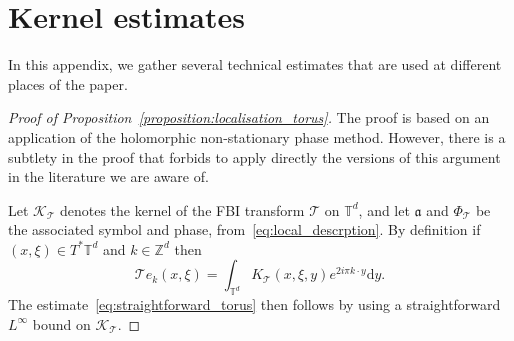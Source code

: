 \documentclass[AHL,Unicode,longabstracts,published]{cedram}
\newcommand{\clT}{\mathcal{T}}
\newcommand{\clK}{\mathcal{K}}
\newcommand{\fka}{\mathfrak{a}}
\newcommand{\bbZ}{\mathbb{Z}}
\newcommand{\bbT}{\mathbb{T}}
\newcommand{\rmd}{\mathrm{d}}
\begin{document}
\appendix

\section{Kernel estimates}\label{appendix:kernel_estimates}

In this appendix, we gather several technical estimates that are used at different places of the paper.

\begin{proof}[Proof of Proposition~\ref{proposition:localisation_torus}]
The proof is based on an application of the holomorphic non-stationary phase method. However, there is a subtlety in the proof that forbids to apply directly the versions of this argument in the literature we are aware of.

Let $\clK _{\clT}$ denotes the kernel of the FBI transform $\clT$ on $\bbT^d$, and let $\fka$ and $\Phi_{\clT}$ be the associated symbol and phase, from~\eqref{eq:local_descrption}. By definition if $(x,\xi) \in T^* \bbT^d$ and $k \in \bbZ^d$ then
\begin{equation}\label{eq:explicit_transform_torus}
\clT e_k (x,\xi) = \int_{\bbT^d} K_{\clT}(x,\xi,y) e^{2 i \pi k \cdot y} \rmd y.
\end{equation}
The estimate~\eqref{eq:straightforward_torus} then follows by using a straightforward $L^\infty$ bound on $\clK _{\clT}$.


\end{proof}
\end{document}
